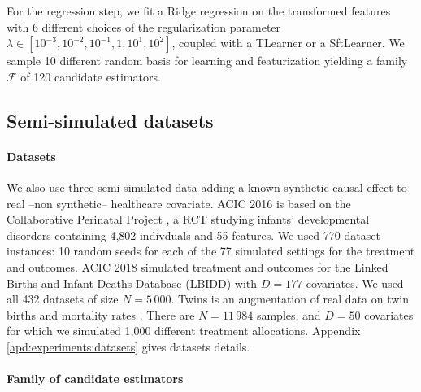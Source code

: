 \documentclass[a4paper,num-refs]{oup-contemporary}%
\begin{document}

For the regression step, we fit a Ridge regression on the transformed features
with 6 different choices of the regularization parameter $\lambda \in [10^{-3},
        10^{-2}, 10^{-1}, 1, 10^{1}, 10^{2}]$, coupled with a TLearner or
a SftLearner.
We sample 10 different random basis for learning and
featurization yielding a family $\mathcal F$ of 120 candidate estimators.
%

\subsection{Semi-simulated datasets}

\paragraph{Datasets}\label{semi_simulated:datasets}

We also use three semi-simulated
data adding a known synthetic causal effect to real --non synthetic-- healthcare
covariate. ACIC 2016 \cite{dorie_automated_2019} is based on the Collaborative
Perinatal Project \cite{niswander_women_1972}, a RCT studying infants’
developmental disorders containing 4,802 indivduals and 55 features. We used 770
dataset instances: 10 random seeds for each of the 77 simulated settings for the
treatment and outcomes.  ACIC 2018 \cite{shimoni_benchmarking_2018} simulated
treatment and outcomes for the Linked Births and Infant Deaths Database (LBIDD)
\cite{macdorman_infant_1998} with $D=177$ covariates. We used all 432 datasets
of size $N=5\,000$.  Twins \cite{louizos_causal_2017} is an augmentation of real
data on twin births and mortality rates \cite{almond_costs_2005}. There are
$N=11\,984$ samples, and $D=50$ covariates for which we simulated 1,000
different treatment allocations. Appendix
\ref{apd:experiments:datasets} gives datasets details.


\paragraph{Family of candidate
    estimators}\label{semi_simulated:candidate_estimators}
\end{document}
